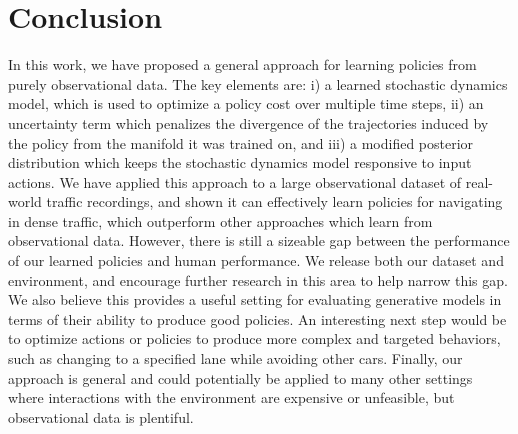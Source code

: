 \documentclass{article} %
\begin{document}


  \section{Conclusion}

  In this work, we have proposed a general approach for learning policies from purely observational data. The key elements are: i) a learned stochastic dynamics model, which is used to optimize a policy cost over multiple time steps, ii) an uncertainty term which penalizes the divergence of the trajectories induced by the policy from the manifold it was trained on, and iii) a modified posterior distribution which keeps the stochastic dynamics model responsive to input actions.
  We have applied this approach to a large observational dataset of real-world traffic recordings, and shown it can effectively learn policies for navigating in dense traffic, which outperform other approaches which learn from observational data.
  However, there is still a sizeable gap between the performance of our learned policies and human performance.
  We release both our dataset and environment, and encourage further research in this area to help narrow this gap.
  We also believe this provides a useful setting for evaluating generative models in terms of their ability to produce good policies.
  An interesting next step would be to optimize actions or policies to produce more complex and targeted behaviors, such as changing to a specified lane while avoiding other cars.
  Finally, our approach is general and could potentially be applied to many other settings where interactions with the environment are expensive or unfeasible, but observational data is plentiful.






\end{document}
